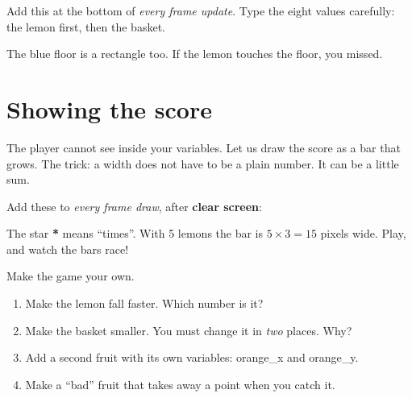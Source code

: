 
\begin{prgmission}
Add this at the bottom of \emph{every frame update}. Type the eight values
carefully: the lemon first, then the basket.

\end{prgmission}

\begin{prgmission}
The blue floor is a rectangle too. If the lemon touches the floor, you missed.

\end{prgmission}

\section{Showing the score}

The player cannot see inside your variables. Let us draw the score as a bar
that grows. The trick: a width does not have to be a plain number. It can be a
little sum.

\begin{prgmission}
Add these to \emph{every frame draw}, after \textbf{clear screen}:


The star \textbf{*} means ``times''. With 5 lemons the bar is $5 \times 3 = 15$
pixels wide. Play, and watch the bars race!
\end{prgmission}

\begin{prgtry}
Make the game your own.
\begin{enumerate}
  \item Make the lemon fall faster. Which number is it?
  \item Make the basket smaller. You must change it in \emph{two} places. Why?
  \item Add a second fruit with its own variables: orange\_x and orange\_y.
  \item Make a ``bad'' fruit that takes away a point when you catch it.
\end{enumerate}
\end{prgtry}

